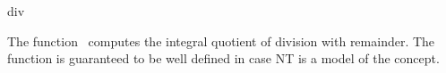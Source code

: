 \begin{ccRefFunction}{div}

\ccDefinition

The function \ccRefName\ computes the integral quotient of division with remainder.
The function is guaranteed to be well defined in case NT
is a model of the  concept. 


{}

\ccSeeAlso

\\
\\
\\
\\

\end{ccRefFunction}

